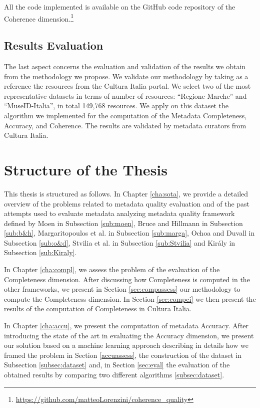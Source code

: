 \documentclass[epsfig,a4paper,12pt,titlepage]{book}
\begin{document}
All the code implemented  is available on the GitHub code repository of the Coherence dimension.\footnote{\url{https://github.com/matteoLorenzini/coherence_quality}}

\subsection{Results Evaluation}

The last aspect concerns the evaluation and validation of the results we obtain from the methodology we propose.
We validate our methodology by taking as a reference the resources from the Cultura Italia portal. We select two of the most representative datasets in terms of number of resources: ``Regione Marche'' and ``MuseID-Italia'', in total 149,768 resources. We apply on this dataset the algorithm we implemented for the computation of the Metadata Completeness, Accuracy, and Coherence. The results are validated by metadata curators from Cultura Italia.

\section{Structure of the Thesis}
\label{sec:structure}

This thesis is structured as follows. In Chapter \ref{cha:sota}, we provide a detailed overview of the problems related to metadata quality evaluation and of the past attempts used to evaluate metadata analyzing metadata quality framework defined by Moen \cite{moen1998assessing} in Subsection \ref{sub:moen}, Bruce and Hillmann \cite{1} in Subsection \ref{sub:b&h}, Margaritopoulos et al. \cite{margaritopoulos2012quantifying} in Subsection \ref{sub:marga}, Ochoa and Duvall \cite{2} in Subsection \ref{sub:o&d}, Stvilia et al. \cite{20} in Subsection \ref{sub:Stvilia} and Kir{\'a}ly \cite{3} in Subsection \ref{sub:Kiraly}.

In Chapter \ref{cha:compl}, we assess the problem of the evaluation of the Completeness dimension. After discussing how  Completeness is computed in the other frameworks, we present in Section \ref{sec:compassess} our methodology to compute the Completeness dimension. In Section \ref{sec:compci} we then present the results of the computation of Completeness in Cultura Italia.

In Chapter \ref{cha:accu}, we present the computation of metadata Accuracy. After introducing the state of the art in evaluating the Accuracy dimension, we present our solution based on a machine learning approach describing in details how we framed the problem in Section \ref{accuassess}, the construction of the dataset in Subsection \ref{subsec:dataset} and, in Section \ref{sec:eval} the evaluation of the obtained results by comparing two different algorithms \ref{subsec:dataset}.
\end{document}
